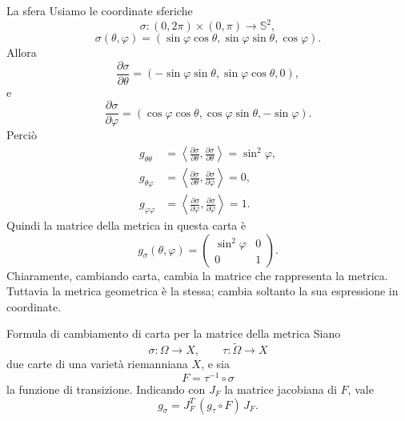 \documentclass[a4paper]{article}
\begin{document}
\begin{snippetexample}{La sfera}
Usiamo le coordinate sferiche
\[
    \sigma:(0,2\pi)\times(0,\pi)\longrightarrow \mathbb{S}^2,
\]
\[
    \sigma(\theta,\varphi)
    =
    (\sin\varphi\cos\theta,\sin\varphi\sin\theta,\cos\varphi).
\]
Allora
\[
    \frac{\partial\sigma}{\partial\theta}
    =
    (-\sin\varphi\sin\theta,\sin\varphi\cos\theta,0),
\]
e
\[
    \frac{\partial\sigma}{\partial\varphi}
    =
    (\cos\varphi\cos\theta,\cos\varphi\sin\theta,-\sin\varphi).
\]
Perciò
\begin{align*}
    g_{\theta\theta}
    &=
    \left\langle
        \frac{\partial\sigma}{\partial\theta},
        \frac{\partial\sigma}{\partial\theta}
    \right\rangle
    =
    \sin^2\varphi,\\
    g_{\theta\varphi}
    &=
    \left\langle
        \frac{\partial\sigma}{\partial\theta},
        \frac{\partial\sigma}{\partial\varphi}
    \right\rangle
    =
    0,\\
    g_{\varphi\varphi}
    &=
    \left\langle
        \frac{\partial\sigma}{\partial\varphi},
        \frac{\partial\sigma}{\partial\varphi}
    \right\rangle
    =
    1.
\end{align*}
Quindi la matrice della metrica in questa carta è
\[
    g_\sigma(\theta,\varphi)
    =
    \begin{pmatrix}
        \sin^2\varphi & 0\\
        0 & 1
    \end{pmatrix}.
\]
Chiaramente, cambiando carta, cambia la matrice che rappresenta la metrica. Tuttavia la metrica geometrica è la stessa; cambia soltanto la sua espressione in coordinate.
\end{snippetexample}

\begin{snippetproposition}{Formula di cambiamento di carta per la matrice della metrica}
Siano
\[
    \sigma:\Omega\longrightarrow X,
    \qquad
    \tau:\widetilde{\Omega}\longrightarrow X
\]
due carte di una varietà riemanniana \(X\), e sia
\[
    F=\tau^{-1}\circ\sigma
\]
la funzione di transizione. Indicando con \(J_F\) la matrice jacobiana di \(F\), vale
\[
    g_\sigma
    =
    J_F^{T}\,(g_\tau\circ F)\,J_F.
\]
\end{snippetproposition}
\end{document}
